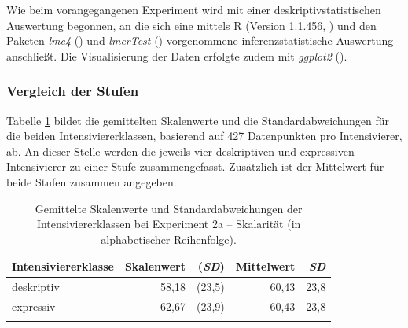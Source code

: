 Wie beim vorangegangenen Experiment wird mit einer deskriptivstatistischen Auswertung begonnen, an die sich eine mittels R (Version 1.1.456, \citealt[]{R.2018}) und den Paketen \textit{lme4} (\citealt[]{Bates.2015}) und \textit{lmerTest} (\citealt[]{Kuznetsova.2017}) vorgenommene inferenzstatistische Auswertung anschließt. Die Visualisierung der Daten erfolgte zudem mit \textit{ggplot2} {(\citealt[]{Wickham.2016}}).



\subsubsection{Vergleich der Stufen}\label{abs:Deskriptivstatistik}





\noindent Tabelle \ref{tab:Skalenwert1} bildet die gemittelten Skalenwerte und die Standardabweichungen für die beiden Intensiviererklassen, basierend auf 427 Datenpunkten pro Intensivierer, ab. An dieser Stelle werden die jeweils vier deskriptiven und expressiven Intensivierer zu einer Stufe zusammengefasst. Zusätzlich ist der Mittelwert für beide Stufen zusammen angegeben. 

%
\begin{table}
\begin{tabularx}{.8\textwidth}{lrrrr}
\lsptoprule
Intensiviererklasse & Skalenwert &  (\textit{SD}) & Mittelwert &  \textit{SD}\\
\midrule
deskriptiv          & 58,18      &  (23,5)        & 60,43      & 23,8\\
expressiv           & 62,67      & (23,9)         & 60,43      & 23,8\\
\lspbottomrule
\end{tabularx}
\caption[Gemittelte Skalenwerte der Stufen bei Experiment 2a]{Gemittelte Skalenwerte und Standardabweichungen der Intensiviererklassen bei Experiment 2a -- Skalarität (in alphabetischer Reihenfolge).}
\label{tab:Skalenwert1}
\end{table}

